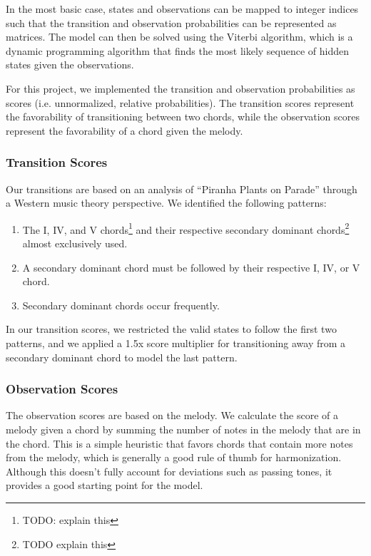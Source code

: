 In the most basic case, states and observations can be mapped to integer indices such that the transition and observation probabilities can be represented as matrices. The model can then be solved using the Viterbi \autocite{HMM:2023} algorithm, which is a dynamic programming algorithm that finds the most likely sequence of hidden states given the observations.

For this project, we implemented the transition and observation probabilities as scores (i.e. unnormalized, relative probabilities). The transition scores represent the favorability of transitioning between two chords, while the observation scores represent the favorability of a chord given the melody.

\subsubsection{Transition Scores}

Our transitions are based on an analysis of ``Piranha Plants on Parade'' through a Western music theory perspective. We identified the following patterns:
\begin{enumerate}
    \item The I, IV, and V chords\footnote{TODO: explain this} and their respective secondary dominant chords\footnote{TODO explain this} almost exclusively used.
    \item A secondary dominant chord must be followed by their respective I, IV, or V chord.
    \item Secondary dominant chords occur frequently.
\end{enumerate}
In our transition scores, we restricted the valid states to follow the first two patterns, and we applied a 1.5x score multiplier for transitioning away from a secondary dominant chord to model the last pattern.

\subsubsection{Observation Scores}

The observation scores are based on the melody. We calculate the score of a melody given a chord by summing the number of notes in the melody that are in the chord. This is a simple heuristic that favors chords that contain more notes from the melody, which is generally a good rule of thumb for harmonization. Although this doesn't fully account for deviations such as passing tones, it provides a good starting point for the model.
